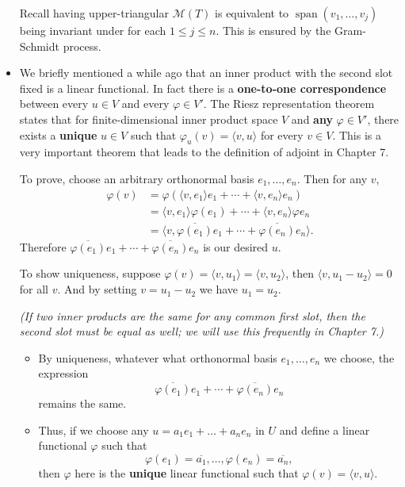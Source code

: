 \documentclass{article}
\newcommand{\s}{\operatorname{span}}
\newcommand{\conj}[1]{\overline{#1}}
\newcommand{\inp}[2]{\langle #1, #2 \rangle}
\newcommand{\M}{\mathcal{M}}
\renewcommand{\phi}{\varphi}
\begin{document}
\begin{itemize}
    Recall having upper-triangular $\M(T)$ is equivalent to $\s(v_1,\dots,v_j)$ being invariant under for each $1 \leq j \leq n$. This is ensured by the Gram-Schmidt process.
    
    
    \item We briefly mentioned a while ago that an inner product with the second slot fixed is a linear functional. In fact there is a \textbf{one-to-one correspondence} between every $u \in V$ and every $\phi \in V'$. The Riesz representation theorem states that for finite-dimensional inner product space $V$ and \textbf{any} $\phi \in V'$, there exists a \textbf{unique} $u \in V$ such that $\phi_u(v) = \inp{v}{u}$ for every $v \in V$. This is a very important theorem that leads to the definition of adjoint in Chapter 7.
    
    To prove, choose an arbitrary orthonormal basis $e_1,\dots,e_n$. Then for any $v$,
    \begin{align*}
        \phi(v) & = \phi(\inp{v}{e_1}e_1+\cdots+\inp{v}{e_n}e_n) \\ & = \inp{v}{e_1}\phi(e_1)+\cdots+\inp{v}{e_n}\phi{e_n} \\ & = \inp{v}{\conj{\phi(e_1)}e_1+\cdots+\conj{\phi(e_n)}e_n}.
    \end{align*}
    Therefore $\conj{\phi(e_1)}e_1+\cdots+\conj{\phi(e_n)}e_n$ is our desired $u$.
    
    To show uniqueness, suppose $\phi(v) = \inp{v}{u_1} = \inp{v}{u_2}$, then $\inp{v}{u_1 - u_2} = 0$ for all $v$. And by setting $v = u_1 - u_2$ we have $u_1 = u_2$.
    
    \textit{(If two inner products are the same for any common first slot, then the second slot must be equal as well; we will use this frequently in Chapter 7.)}
    \begin{itemize}
        \item By uniqueness, whatever what orthonormal basis $e_1,\dots,e_n$ we choose, the expression $$\conj{\phi(e_1)}e_1+\cdots+\conj{\phi(e_n)}e_n$$ remains the same.
        \item Thus, if we choose any $u = a_1 e_1 + \dots + a_n e_n$ in $U$ and define a linear functional $\phi$ such that $$\phi(e_1)=\conj{a_1},\dots,\phi(e_n)=\conj{a_n},$$ then $\phi$ here is the \textbf{unique} linear functional such that $\phi(v) = \inp{v}{u}$.
    \end{itemize}
\end{itemize}
\end{document}
